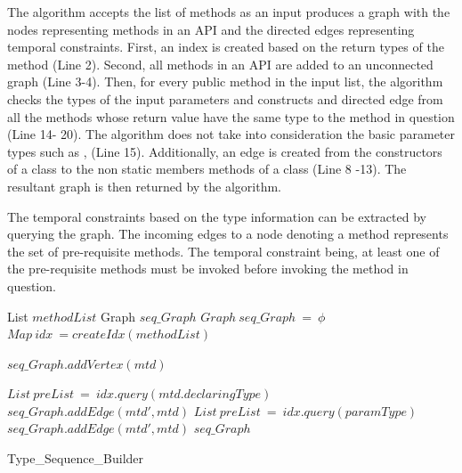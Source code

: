 The algorithm accepts the list of methods as an input produces a graph with
the nodes representing methods in an API and the directed edges representing temporal constraints.
First, an index is created based on the return types of the method (Line 2).
Second, all methods in an API are added to an unconnected graph (Line 3-4).
Then, for every public method in the input list, the algorithm checks the types
of the input parameters and constructs and directed edge from all the methods whose return value
have the same type to the method in question (Line 14- 20).
The algorithm does not take into consideration the basic parameter types such as ,  (Line 15).
Additionally, an edge is created from the constructors of a class to the non static members methods of a class (Line 8 -13).
The resultant graph is then returned by the algorithm.


The temporal constraints based on the type information can be extracted by querying the graph. 
The incoming edges to a node denoting a method represents the set of pre-requisite methods.
The temporal constraint being, at least one of the pre-requisite methods must be invoked before invoking the method in question.


\begin{algorithm}[t!]
\begin{algorithmic}[1]
\begin{scriptsize}
\REQUIRE List $methodList$ 
\ENSURE Graph $seq\_Graph$
\STATE $Graph\ seq\_Graph\ =\ \phi$
\STATE $Map\ idx\ = createIdx(methodList)$

	\STATE $seq\_Graph.addVertex(mtd)$
\ENDFOR

			\STATE $List\ preList\ =\ idx.query(mtd.declaringType)$
				\STATE $seq\_Graph.addEdge(mtd',mtd)$
			\ENDFOR
		\ENDIF
				\STATE $List\ preList\ =\ idx.query(paramType)$
					\STATE $seq\_Graph.addEdge(mtd',mtd)$
				\ENDFOR				
			\ENDIF
		\ENDFOR
	\ENDIF
\ENDFOR
\RETURN $seq\_Graph$
\end{scriptsize}
\end{algorithmic}
\caption{Type\_Sequence\_Builder}
\label{alg:TypeAnalysis}
\end{algorithm} 

